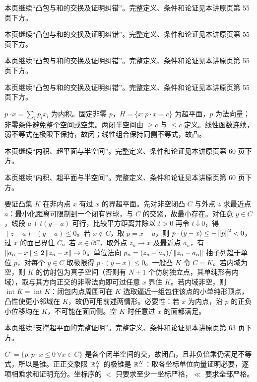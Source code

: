 本页继续“凸包与和的交换及证明纠错”。完整定义、条件和论证见本讲原页第 55 页下方。

本页继续“凸包与和的交换及证明纠错”。完整定义、条件和论证见本讲原页第 55 页下方。

本页继续“凸包与和的交换及证明纠错”。完整定义、条件和论证见本讲原页第 55 页下方。

本页继续“凸包与和的交换及证明纠错”。完整定义、条件和论证见本讲原页第 55 页下方。

$p\cdot x=\sum_i p_ix_i$ 为内积。固定非零 $p$，$H=\{x:p\cdot x=c\}$ 为超平面，$p$ 为法向量；非零条件避免整个空间或空集。两闭半空间由 $\ge c$ 与 $\le c$ 定义。线性函数连续，弱不等式在极限下保持，故闭；线性组合保持同侧不等式，故凸。

本页继续“内积、超平面与半空间”。完整定义、条件和论证见本讲原页第 60 页下方。

本页继续“内积、超平面与半空间”。完整定义、条件和论证见本讲原页第 60 页下方。

要证凸集 $K$ 在非内点 $x$ 有过 $x$ 的界超平面。先对非空闭凸 $C$ 与外点 $z$ 求最近点 $a$：最小化距离可限制到一个闭有界球，与 $C$ 的交紧，故最小存在。对任意 $y\in C$，线段 $a+t(y-a)$ 可行，比较平方距离并除以 $t>0$ 再令 $t\downarrow0$，得 $(z-a)\cdot(y-a)\le0$。若 $x\notin C$，取 $p=x-a$，则 $p\cdot(y-x)\le-\left\lVert p\right\rVert^2<0$，过 $x$ 的面已界住 $C$。若 $x\in\partial C$，取外点 $z_n\to x$ 及最近点 $a_n$，有 $\left\lVert a_n-x\right\rVert\le2\left\lVert z_n-x\right\rVert\to0$。单位法向 $p_n=(z_n-a_n)/\left\lVert z_n-a_n\right\rVert$ 抽子列趋于单位 $p$，对每个 $y\in C$ 取极限得 $p\cdot(y-x)\le0$。一般凸 $K$ 令 $C=\overline K$。若内域为空，则 $K$ 的仿射包为真子空间（否则有 $N+1$ 个仿射独立点，其单纯形有内域），取与其方向正交的非零法向即可过任意 $x$ 界住 $K$。若内域非空，则 $\operatorname{int}\overline K=\operatorname{int}K$：闭包内点周围可在 $K$ 选取逼近一组包住该点的小单纯形顶点，凸性使更小邻域在 $K$，故仍可用前述两情形。必要性：若 $x$ 为内点，沿 $p$ 的正负小位移均在 $K$，不可能在面同侧。空 $K$ 时任意过 $x$ 的面都满足。

本页继续“支撑超平面的完整证明”。完整定义、条件和论证见本讲原页第 63 页下方。

$C^\circ=\{p:p\cdot x\le0\ \forall x\in C\}$ 是各个闭半空间的交，故闭凸，且非负倍乘仍满足不等式，所以是锥。正正交象限 $\mathbb{R}_+^N$ 的极锥是 $\mathbb{R}_-^N$：取各坐标单位向量证明必要，逐项相乘求和证明充分。坐标序的 $<$ 只要求至少一坐标严格，$\ll$ 要求全部严格。

